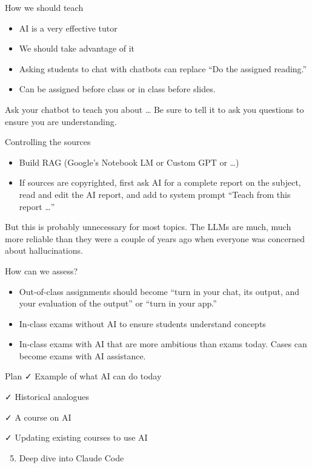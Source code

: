 \documentclass[
  ignorenonframetext,
]{beamer}
\providecommand{\tightlist}{%
  \setlength{\itemsep}{0pt}\setlength{\parskip}{0pt}}\usepackage{longtable,booktabs,array}
\begin{document}
\begin{frame}{How we should teach}
\label{how-we-should-teach}
\begin{itemize}
\tightlist
\item
  AI is a very effective tutor
\item
  We should take advantage of it
\item
  {Asking students to chat with chatbots can replace ``Do the assigned
  reading.''}
\item
  Can be assigned before class or in class before slides.
\end{itemize}

Ask your chatbot to teach you about \ldots{} Be sure to tell it to ask
you questions to ensure you are understanding.
\end{frame}

\begin{frame}{Controlling the sources}
\label{controlling-the-sources}
\begin{itemize}
\tightlist
\item
  Build RAG (Google's Notebook LM or Custom GPT or \ldots)
\item
  If sources are copyrighted, first ask AI for a complete report on the
  subject, read and edit the AI report, and add to system prompt ``Teach
  from this report \ldots{}''
\end{itemize}

But this is probably unnecessary for most topics. The LLMs are much,
much more reliable than they were a couple of years ago when everyone
was concerned about hallucinations.
\end{frame}

\begin{frame}{How can we assess?}
\label{how-can-we-assess}
\begin{itemize}[<+->]
\tightlist
\item
  Out-of-class assignments should become ``turn in your chat, its
  output, and your evaluation of the output'' or ``turn in your app.''
\item
  In-class {exams without AI} to ensure students understand concepts
\item
  In-class {exams with AI} that are more ambitious than exams today.
  Cases can become exams with AI assistance.
\end{itemize}
\end{frame}

\begin{frame}{Plan}
\label{plan-3}
✓ Example of what AI can do today

✓ Historical analogues

✓ A course on AI

✓ Updating existing courses to use AI

\begin{enumerate}
\setcounter{enumi}{4}
\tightlist
\item
  Deep dive into Claude Code
\end{enumerate}
\end{frame}
\end{document}
